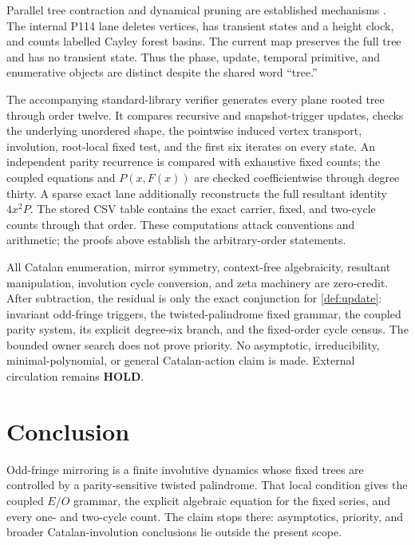 \documentclass[10pt,a4paper]{amsart}
\theoremstyle{definition}
\theoremstyle{remark}
\begin{document}
Parallel tree contraction and dynamical pruning are established mechanisms
\cite{MillerReif1985,KovchegovZaliapin2020}.  The internal P114 lane deletes
vertices, has transient states and a height clock, and counts labelled Cayley
forest basins.  The current map preserves the full tree and has no transient
state.  Thus the phase, update, temporal primitive, and enumerative objects
are distinct despite the shared word ``tree.''

The accompanying standard-library verifier generates every plane rooted tree
through order twelve.  It compares recursive and snapshot-trigger updates,
checks the underlying unordered shape, the pointwise induced vertex
transport, involution, root-local fixed test, and the first six iterates on
every state.  An independent parity recurrence is compared with exhaustive
fixed counts; the coupled equations and $P(x,F(x))$ are checked
coefficientwise through degree thirty.  A sparse exact lane additionally
reconstructs the full resultant identity $4x^2P$.  The stored CSV table
contains the exact carrier, fixed, and two-cycle counts through that order.
These computations attack conventions and arithmetic; the proofs above
establish the arbitrary-order statements.

All Catalan enumeration, mirror symmetry, context-free algebraicity,
resultant manipulation, involution cycle conversion, and zeta machinery are
zero-credit.  After subtraction, the residual is only the exact conjunction
for \cref{def:update}: invariant odd-fringe triggers, the twisted-palindrome
fixed grammar, the coupled parity system, its explicit degree-six branch,
and the fixed-order cycle census.  The bounded owner search does not prove
priority.  No asymptotic, irreducibility, minimal-polynomial, or general
Catalan-action claim is made.  External circulation remains \textbf{HOLD}.

\section{Conclusion}

Odd-fringe mirroring is a finite involutive dynamics whose fixed trees are
controlled by a parity-sensitive twisted palindrome.  That local condition
gives the coupled $E/O$ grammar, the explicit algebraic equation for the
fixed series, and every one- and two-cycle count.  The claim stops there:
asymptotics, priority, and broader Catalan-involution conclusions lie outside
the present scope.



\end{document}
